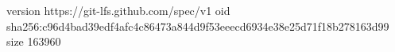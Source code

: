 version https://git-lfs.github.com/spec/v1
oid sha256:c96d4bad39edf4afc4c86473a844d9f53eeecd6934e38e25d71f18b278163d99
size 163960
